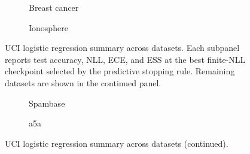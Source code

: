 \begin{figure}[t]
  \centering
  \begin{subfigure}[t]{0.9\linewidth}
    \centering
    \caption{Breast cancer}
    \label{fig:uci_breast_cancer}
  \end{subfigure}

  \vspace{0.25em}

  \begin{subfigure}[t]{0.9\linewidth}
    \centering
    \caption{Ionosphere}
    \label{fig:uci_ionosphere}
  \end{subfigure}
  \caption{UCI logistic regression summary across datasets. Each subpanel
  reports test accuracy, NLL, ECE, and ESS at the best finite-NLL checkpoint
  selected by the predictive stopping rule. Remaining datasets are shown in the
  continued panel.}
  \label{fig:uci_summary}
\end{figure}

\begin{figure}[t]
  \ContinuedFloat
  \centering
  \begin{subfigure}[t]{0.9\linewidth}
    \centering
    \caption{Spambase}
    \label{fig:uci_spambase}
  \end{subfigure}

  \vspace{0.25em}

  \begin{subfigure}[t]{0.9\linewidth}
    \centering
    \caption{a5a}
    \label{fig:uci_a5a}
  \end{subfigure}
  \caption[]{UCI logistic regression summary across datasets (continued).}
\end{figure}

